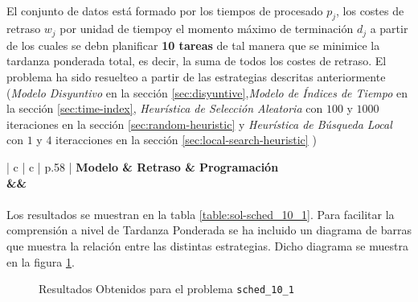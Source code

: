\documentclass[spanish]{article}
\begin{document}
			\paragraph{}
			El conjunto de datos está formado por los tiempos de procesado $p_j$, los costes de retraso $w_j$ por unidad de tiempoy el momento máximo de terminación $d_j$ a partir de los cuales se debn planificar \textbf{10 tareas} de tal manera que se minimice la tardanza ponderada total, es decir, la suma de todos los costes de retraso. El problema ha sido resuelteo a partir de las estrategias descritas anteriormente (\emph{Modelo Disyuntivo} en la sección \ref{sec:disyuntive},\emph{Modelo de Índices de Tiempo} en la sección \ref{sec:time-index}, \emph{Heurística de Selección Aleatoria} con $100$ y $1000$ iteraciones en la sección \ref{sec:random-heuristic} y \emph{Heurística de Búsqueda Local} con $1$ y $4$ iteracciones en la sección \ref{sec:local-search-heuristic} )

			\begin{table}
				\centering
				\begin{tabu}{ | c | c | p{.58\linewidth} |}
					\hline
					\bfseries Modelo & \bfseries Retraso & \bfseries Programación
					{\\\hline\model&\delay&\schedule}
					\\\hline
				\end{tabu}
				\caption{Resultados Obtenidos para el problema \texttt{sched\_10\_1}}
				\label{table:sol-sched_10_1}
			\end{table}

			\paragraph{}
			Los resultados se muestran en la tabla \ref{table:sol-sched_10_1}. Para facilitar la comprensión a nivel de Tardanza Ponderada se ha incluido un diagrama de barras que muestra la relación entre las distintas estrategias. Dicho diagrama se muestra en la figura \ref{plot:sol-sched_10_1}.

			\begin{figure}
				\begin{center}
				\end{center}
				\caption{Resultados Obtenidos para el problema \texttt{sched\_10\_1}}
				\label{plot:sol-sched_10_1}
			\end{figure}
\end{document}
